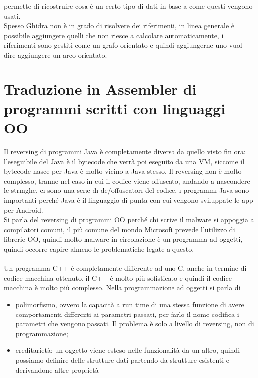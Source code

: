 \documentclass[12pt, oneside]{extbook}
\begin{document}
permette di ricostruire cosa è un certo tipo di dati in base a come questi vengono usati.\\ Spesso Ghidra non è in grado di risolvere dei riferimenti, in linea generale è possibile aggiungere quelli che non riesce a calcolare automaticamente, i riferimenti sono gestiti come un grafo orientato e quindi aggiungerne uno vuol dire aggiungere un arco orientato.
\section{Traduzione in Assembler di programmi scritti con linguaggi OO}
Il reversing di programmi Java è completamente diverso da quello visto fin ora: l'eseguibile del Java è il bytecode che verrà poi eseguito da una VM, siccome il bytecode nasce per Java è molto vicino a Java stesso. Il reversing non è molto complesso, tranne nel caso in cui il codice viene offuscato, andando a nascondere le stringhe, ci sono una serie di de/offuscatori del codice, i programmi Java sono importanti perché Java è il linguaggio di punta con cui vengono sviluppate le app per Android.\\ Si parla del reversing di programmi OO perché chi scrive il malware si appoggia a compilatori comuni, il più comune del mondo Microsoft prevede l'utilizzo di librerie OO, quindi molto malware in circolazione è un programma ad oggetti, quindi occorre capire almeno le problematiche legate a questo.\\\\ Un programma C++ è completamente differente ad uno C, anche in termine di codice macchina ottenuto, il C++ è molto più sofisticato e quindi il codice macchina è molto più complesso. Nella programmazione ad oggetti si parla di 
\begin{itemize}
\item polimorfismo, ovvero la capacità a run time di una stessa funzione di avere comportamenti differenti ai parametri passati, per farlo il nome codifica i parametri che vengono passati. Il problema è solo a livello di reversing, non di programmazione;
\item ereditarietà: un oggetto viene esteso nelle funzionalità da un altro, quindi possiamo definire delle strutture dati partendo da strutture esistenti e derivandone altre proprietà
\end{itemize}
\end{document}
